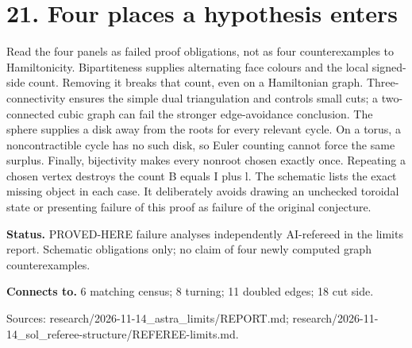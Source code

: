 \section*{21. Four places a hypothesis enters}
\begin{center}\begin{minipage}{.86\textwidth}\centering
{}
\end{minipage}\end{center}
Read the four panels as failed proof obligations, not as four counterexamples to Hamiltonicity. Bipartiteness supplies alternating face colours and the local signed-side count. Removing it breaks that count, even on a Hamiltonian graph. Three-connectivity ensures the simple dual triangulation and controls small cuts; a two-connected cubic graph can fail the stronger edge-avoidance conclusion. The sphere supplies a disk away from the roots for every relevant cycle. On a torus, a noncontractible cycle has no such disk, so Euler counting cannot force the same surplus. Finally, bijectivity makes every nonroot chosen exactly once. Repeating a chosen vertex destroys the count B equals I plus l. The schematic lists the exact missing object in each case. It deliberately avoids drawing an unchecked toroidal state or presenting failure of this proof as failure of the original conjecture.

\textbf{Status.} PROVED-HERE failure analyses independently AI-refereed in the limits report. Schematic obligations only; no claim of four newly computed graph counterexamples.

\textbf{Connects to.} 6 matching census; 8 turning; 11 doubled edges; 18 cut side.

{\footnotesize\raggedright Sources: research/\allowbreak{}2026-11-14\_astra\_limits/\allowbreak{}REPORT.md;\allowbreak{} research/\allowbreak{}2026-11-14\_sol\_referee-structure/\allowbreak{}REFEREE-limits.md.\par}
